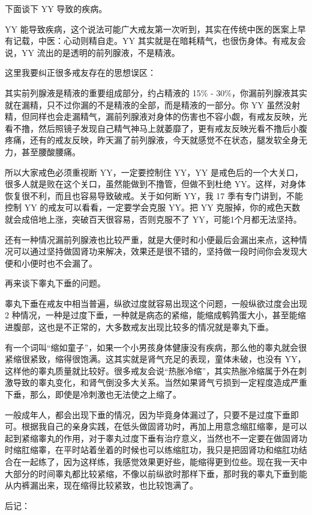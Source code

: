 \documentclass[fontset=founder]{ctexart}
\begin{document}
下面谈下 YY 导致的疾病。

YY 能导致疾病，这个说法可能广大戒友第一次听到，其实在传统中医的医案上早有记载，中医：心动则精自走。YY 其实就是在暗耗精气，也很伤身体。有戒友会说，YY 流出的是透明的前列腺液，不是精液。

这里我要纠正很多戒友存在的思想误区：

其实前列腺液是精液的重要组成部分，约占精液的 15\% - 30\%，你漏前列腺液其实就在漏精，只不过你漏的不是精液的全部，而是精液的一部分。你 YY 虽然没射精，但同样也会走漏精气，漏前列腺液对身体的伤害也不容小觑，有戒友反映，光看不撸，然后照镜子发现自己精气神马上就萎靡了，更有戒友反映光看不撸后小腹疼痛，还有的戒友反映，昨天漏了前列腺液，今天就感觉不在状态，腿发软全身无力，甚至腰酸腰痛。

所以大家戒色必须重视断 YY，一定要控制住 YY，YY 是戒色后的一个大关口，很多人就是败在这个关口，虽然能做到不撸管，但做不到杜绝 YY。这样，对身体恢复很不利，而且也容易导致破戒。关于如何断 YY，我 17 季有专门讲到，不能控制 YY 的戒友可以看看，一定要学会克服 YY。把 YY 克服掉，你的戒色天数就会成倍地上涨，突破百天很容易，否则克服不了 YY，可能1个月都无法坚持。

还有一种情况漏前列腺液也比较严重，就是大便时和小便最后会漏出来点，这种情况可以通过坚持做固肾功来解决，效果还是很不错的，坚持做一段时间你会发现大便和小便时也不会漏了。

再来谈下睾丸下垂的问题。

睾丸下垂在戒友中相当普遍，纵欲过度就容易出现这个问题，一般纵欲过度会出现 2 种情况，一种是过度下垂，一种就是病态的紧缩，能缩成鹌鹑蛋大小，甚至能缩进腹部，这也是不正常的，大多数戒友出现比较多的情况就是睾丸下垂。

有一个词叫“缩如童子”，如果一个小男孩身体健康没有疾病，那么他的睾丸就会很紧缩很紧致，缩得很饱满。这其实就是肾气充足的表现，童体未破，也没有 YY，这样他的睾丸质量就比较好。很多戒友会说“热胀冷缩”，其实热胀冷缩属于外在刺激导致的睾丸变化，和肾气倒没多大关系。当然如果肾气亏损到一定程度造成严重下垂，那么，即使是冷刺激也无法使之上缩了。

一般成年人，都会出现下垂的情况，因为毕竟身体漏过了，只要不是过度下垂即可。根据我自己的亲身实践，在低头做固肾功时，再加上用意念缩肛缩睾，是可以起到紧缩睾丸的作用，对于睾丸过度下垂有治疗意义，当然也不一定要在做固肾功时缩肛缩睾，在平时站着坐着的时候也可以练缩肛功，我只是把固肾功和缩肛功结合在一起练了，因为这样练，我感觉效果更好些，能缩得更到位些。现在我一天中大部分的时间睾丸都比较紧缩，不像以前纵欲时那样下垂，那时我的睾丸下垂到能从内裤漏出来，现在缩得比较紧致，也比较饱满了。

后记：
\end{document}
